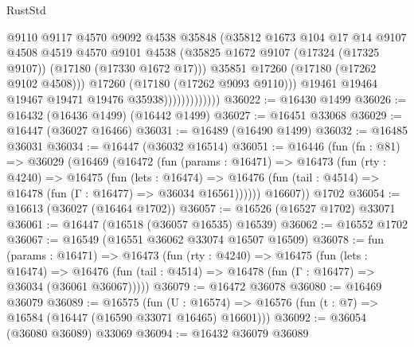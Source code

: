 \begin{lexlean}{RustStd}
\begin{coremodule}
                                @9110
                                @9117
                                @4570
                                @9092
                                @4538
                                @35848
                                (@35812
                                  @1673
                                  @104
                                  @17
                                  @14
                                  @9107
                                  @4508
                                  @4519
                                  @4570
                                  @9101
                                  @4538
                                  (@35825
                                    @1672
                                    @9107
                                    (@17324 (@17325 @9107))
                                    (@17180 (@17330 @1672 @17)))
                                  @35851
                                  @17260
                                  (@17180 (@17262 @9102 @4508)))
                                @17260
                                (@17180 (@17262 @9093 @9110)))
                              @19461
                              @19464
                              @19467
                              @19471
                              @19476
                              @35938)))))))))))))
@36022 := @16430 @1499
@36026 := @16432 (@16436 @1499) (@16442 @1499)
@36027 := @16451 @33068
@36029 := @16447 (@36027 @16466)
@36031 := @16489 (@16490 @1499)
@36032 := @16485 @36031
@36034 := @16447 (@36032 @16514)
@36051 := @16446
    (fun (fn : @81) =>
    @36029
      (@16469
        (@16472
          (fun (params : @16471) =>
          @16473
            (fun (rty : @4240) =>
            @16475
              (fun (lets : @16474) =>
              @16476 (fun (tail : @4514) => @16478 (fun (Γ : @16477) => @36034 @16561))))))
        @16607))
    @1702
@36054 := @16613 (@36027 (@16464 @1702))
@36057 := @16526 (@16527 @1702) @33071
@36061 := @16447 (@16518 (@36057 @16535) @16539)
@36062 := @16552 @1702
@36067 := @16549 (@16551 @36062 @33074 @16507 @16509)
@36078 := fun (params : @16471) =>
  @16473
    (fun (rty : @4240) =>
    @16475
      (fun (lets : @16474) =>
      @16476 (fun (tail : @4514) => @16478 (fun (Γ : @16477) => @36034 (@36061 @36067)))))
@36079 := @16472 @36078
@36080 := @16469 @36079
@36089 := @16575
    (fun (U : @16574) => @16576 (fun (t : @7) => @16584 (@16447 (@16590 @33071 @16465) @16601)))
@36092 := @36054 (@36080 @36089) @33069
@36094 := @16432 @36079 @36089

\end{coremodule}
\end{lexlean}
